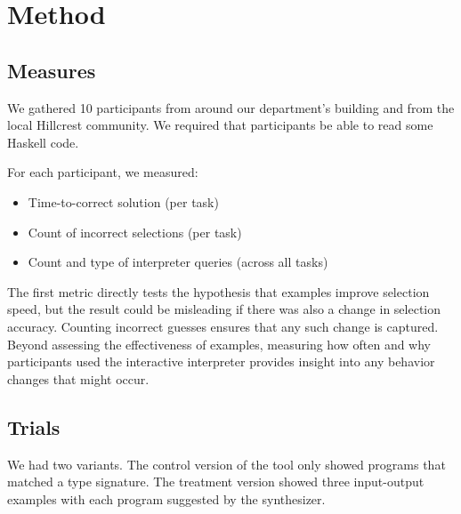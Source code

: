 \section{Method}




\subsection{Measures}
We gathered 10 participants from around our department's building and from the
local Hillcrest community.
%
We required that participants be able to read some Haskell code.

For each participant, we measured:
\begin{itemize}
    \item Time-to-correct solution (per task)
    \item Count of incorrect selections (per task)
    \item Count and type of interpreter queries (across all tasks)
\end{itemize}

The first metric directly tests the hypothesis that examples improve
selection speed, but the result could be misleading if there was also a
change in selection accuracy.
%
Counting incorrect guesses ensures that any such change is captured.
%
Beyond assessing the effectiveness of examples, measuring how often and why
participants used the interactive interpreter provides insight into any
behavior changes that might occur.

\subsection{Trials}
We had two variants.
%
The control version of the tool only showed programs that matched a type signature.
%
The treatment version showed three input-output examples with each program
suggested by the synthesizer.

